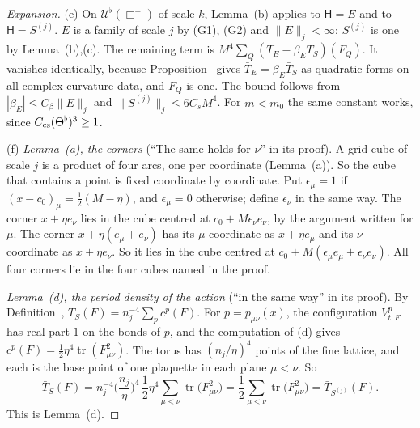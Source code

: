 \begin{proof}[Expansion]
(e) On $\mathcal U^\flat(\Box^+)$ of scale $k$, Lemma~(b) applies to $\mathsf H=E$ and to $\mathsf H=S^{(j)}$. $E$ is a family of scale $j$ by (G1), (G2) and $\|E\|_j<\infty$; $S^{(j)}$ is one by Lemma~(b),(c). The remaining term is $M^4\sum_Q(\bar T_E-\beta_E\bar T_S)(F_Q)$. It vanishes identically, because Proposition~ gives $\bar T_E=\beta_E\bar T_S$ as quadratic forms on all complex curvature data, and $F_Q$ is one. The bound follows from $|\beta_E|\le C_\beta\|E\|_j$ and $\|S^{(j)}\|_j\le6C_sM^4$. For $m<m_0$ the same constant works, since $C_{\rm cs}(\Theta^\flat)^3\ge1$.

(f) \emph{Lemma~(a), the corners} (``The same holds for $\nu$'' in its proof). A grid cube of scale $j$ is a product of four arcs, one per coordinate (Lemma~(a)). So the cube that contains a point is fixed coordinate by coordinate. Put $\epsilon_\mu=1$ if $(x-c_0)_\mu=\frac12(M-\eta)$, and $\epsilon_\mu=0$ otherwise; define $\epsilon_\nu$ in the same way. The corner $x+\eta e_\nu$ lies in the cube centred at $c_0+M\epsilon_\nu e_\nu$, by the argument written for $\mu$. The corner $x+\eta(e_\mu+e_\nu)$ has its $\mu$-coordinate as $x+\eta e_\mu$ and its $\nu$-coordinate as $x+\eta e_\nu$. So it lies in the cube centred at $c_0+M(\epsilon_\mu e_\mu+\epsilon_\nu e_\nu)$. All four corners lie in the four cubes named in the proof.

\emph{Lemma~(d), the period density of the action} (``in the same way'' in its proof). By Definition~, $\bar T_S(F)=n_j^{-4}\sum_pc^p(F)$. For $p=p_{\mu\nu}(x)$, the configuration $V^p_{t,F}$ has real part $1$ on the bonds of $p$, and the computation of (d) gives $c^p(F)=\frac12\eta^4\operatorname{tr}(F_{\mu\nu}^2)$. The torus has $(n_j/\eta)^4$ points of the fine lattice, and each is the base point of one plaquette in each plane $\mu<\nu$. So
\[
\bar T_S(F)=n_j^{-4}\Big(\frac{n_j}{\eta}\Big)^4\,\frac12\eta^4\sum_{\mu<\nu}\operatorname{tr}\big(F_{\mu\nu}^2\big)=\frac12\sum_{\mu<\nu}\operatorname{tr}\big(F_{\mu\nu}^2\big)=\bar T_{S^{(j)}}(F).
\]
This is Lemma~(d).
\end{proof}

